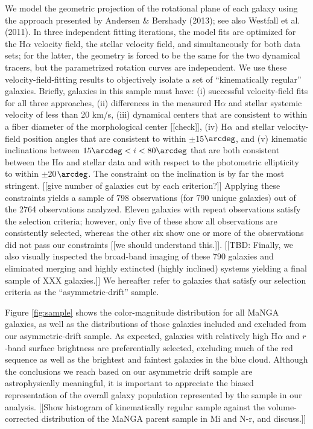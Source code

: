 \documentclass[apj,iop,revtex4,numberedappendix]{emulateapj}
\begin{document}
We model the geometric projection of the rotational plane of each galaxy
using the approach presented by Andersen \& Bershady (2013); see also
Westfall et al. (2011).  In three independent fitting iterations, the
model fits are optimized for the H$\alpha$ velocity field, the stellar
velocity field, and simultaneously for both data sets; for the latter,
the geometry is forced to be the same for the two dynamical tracers, but
the parametrized rotation curves are independent.  We use these
velocity-field-fitting results to objectively isolate a set of
``kinematically regular'' galaxies.  Briefly, galaxies in this sample
must have: (i) successful velocity-field fits for all three approaches,
(ii) differences in the measured H$\alpha$ and stellar systemic velocity
of less than 20 km/s, (iii) dynamical centers that are consistent to
within a fiber diameter of the morphological center [[check]], (iv)
H$\alpha$ and stellar velocity-field position angles that are consistent
to within $\pm$15$\arcdeg$, and (v) kinematic inclinations between
$15\arcdeg < i < 80\arcdeg$ that are both consistent between the
H$\alpha$ and stellar data and with respect to the photometric
ellipticity to within $\pm$20$\arcdeg$.  The constraint on the
inclination is by far the most stringent. [[give number of galaxies cut
by each criterion?]]  Applying these constraints yields a sample of 798
observations (for 790 unique galaxies) out of the 2764 observations
analyzed.  Eleven galaxies with repeat observations satisfy the
selection criteria; however, only five of these show all observations
are consistently selected, whereas the other six show one or more of the
observations did not pass our constraints [[we should understand
this.]].  [[TBD: Finally, we also visually inspected the broad-band
imaging of these 790 galaxies and eliminated merging and highly
extincted (highly inclined) systems yielding a final sample of XXX
galaxies.]]  We hereafter refer to galaxies that satisfy our selection
criteria as the ``asymmetric-drift'' sample.

Figure \ref{fig:sample} shows the color-magnitude distribution for all
MaNGA galaxies, as well as the distributions of those galaxies included
and excluded from our asymmetric-drift sample.  As expected, galaxies
with relatively high H$\alpha$ and $r$-band surface brightness are
preferentially selected, excluding much of the red sequence as well as
the brightest and faintest galaxies in the blue cloud.  Although the
conclusions we reach based on our asymmetric drift sample are
astrophysically meaningful, it is important to appreciate the biased
representation of the overall galaxy population represented by the
sample in our analysis.  [[Show histogram of kinematically regular
sample against the volume-corrected distribution of the MaNGA parent
sample in Mi and N-r, and discuss.]]
\end{document}
